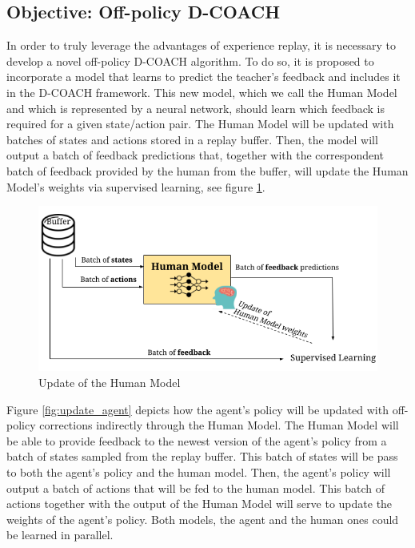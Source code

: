 

\subsection{Objective: Off-policy D-COACH}


In order to truly leverage the advantages of experience replay, it is necessary  to develop a novel off-policy D-COACH algorithm. To do so, it is proposed to incorporate a model that learns to predict the teacher’s feedback and includes it in the D-COACH framework. This new model, which we call the Human Model and which is represented by a neural network, should learn which feedback is required for a given state/action pair. The Human Model will be updated with batches of states and actions stored in a replay buffer. Then, the model will output a batch of feedback predictions that, together with the correspondent batch of feedback provided by the human from the buffer, will update the Human Model's weights via supervised learning, see figure \ref{fig:update_human_model}. 


\begin{figure}[H]
    \centering
    \includegraphics[width=.7\textwidth]{Figures/train_human_model.png}
    \caption{Update of the Human Model}
    \label{fig:update_human_model}
\end{figure}

Figure \ref{fig:update_agent} depicts how the agent's policy will be updated with off-policy corrections indirectly through the Human Model. The Human Model will be able to provide feedback to the newest version of the agent’s policy from a batch of states sampled from the replay buffer. This batch of states will be pass to both the agent's policy and the human model. Then, the agent's policy will output a batch of actions that will be fed to the human model. This batch of actions together with the output of the Human Model will serve to update the weights of the agent's policy. Both models, the agent and the human ones could be learned in parallel.




